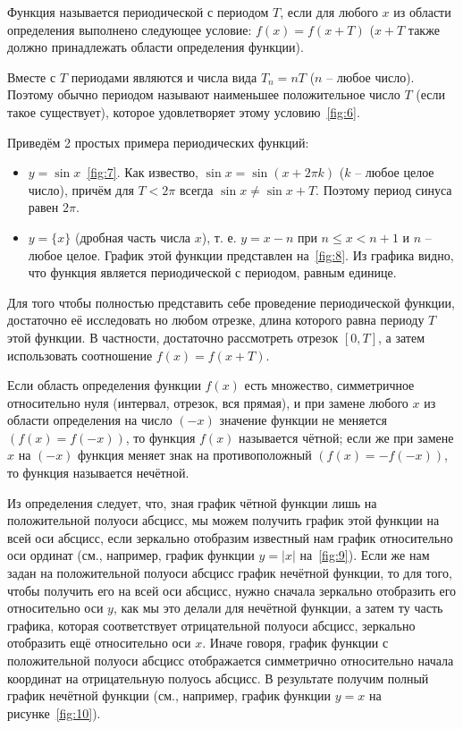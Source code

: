 \begin{definition}
	Функция называется периодической с периодом $T$, если для любого $x$ из
	области определения выполнено следующее условие: $f(x) = f(x + T)$ ($x +
	T$ также должно принадлежать области определения функции).
\end{definition}

Вместе с $T$ периодами являются и числа вида $T_n = nT$ ($n$ -- любое число).
Поэтому обычно периодом называют наименьшее положительное число $T$ (если такое
существует), которое удовлетворяет этому условию~\ref{fig:6}.


Приведём 2 простых примера периодических функций:
\begin{itemize}
	\item $y = \sin{x}$~\ref{fig:7}. Как извество, $\sin{x} = \sin{(x + 2\pi
		k)}$ ($k$ -- любое целое число), причём для $T < 2\pi$ всегда
		$\sin{x} \neq \sin{x + T}$. Поэтому период синуса равен $2\pi$.
	\item $y = \{x\}$ (дробная часть числа $x$), т. е. $y = x - n$ при $n
		\leq x < n + 1$ и $n$ -- любое целое. График этой функции
		представлен на~\ref{fig:8}. Из графика видно, что функция
		является периодической с периодом, равным единице.
\end{itemize}


Для того чтобы полностью представить себе проведение периодической функции,
достаточно её исследовать но любом отрезке, длина которого равна периоду $T$
этой функции. В частности, достаточно рассмотреть отрезок $[0,T]$, а затем
использовать соотношение $f(x) = f(x + T)$.

\begin{definition}
	Если область определения функции $f(x)$ есть множество, симметричное
	относительно нуля (интервал, отрезок, вся прямая), и при замене любого
	$x$ из области определения на число $(-x)$ значение функции не меняется
	$(f(x) = f(-x))$, то функция $f(x)$ называется чётной; если же при
	замене $x$ на $(-x)$ функция меняет знак на противоположный $(f(x) = -
	f(-x))$, то функция называется нечётной.
\end{definition}

Из определения следует, что, зная график чётной функции лишь на положительной
полуоси абсцисс, мы можем получить график этой функции на всей оси абсцисс, если
зеркально отобразим известный нам график относительно оси ординат (см.,
например, график функции $y = |x|$ на~\ref{fig:9}). Если же нам задан на
положительной полуоси абсцисс график нечётной функции, то для того, чтобы
получить его на всей оси абсцисс, нужно сначала зеркально отобразить его
относительно оси $y$, как мы это делали для нечётной функции, а затем ту часть
графика, которая соответствует отрицательной полуоси абсцисс, зеркально
отобразить ещё относительно оси $x$. Иначе говоря, график функции с
положительной полуоси абсцисс отображается симметрично относительно начала
координат на отрицательную полуось абсцисс. В результате получим полный график
нечётной функции (см., например, график функции $y = x$ на
рисунке~\ref{fig:10}).

